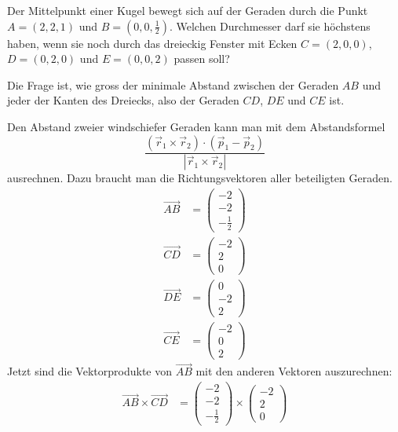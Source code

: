 Der Mittelpunkt einer Kugel bewegt sich auf der Geraden durch
die Punkt $A=(2,2,1)$ und $B=(0,0,\frac12)$. Welchen Durchmesser
darf sie höchstens haben, wenn sie noch durch das dreieckig
Fenster mit Ecken $C=(2,0,0)$, $D=(0,2,0)$ und $E=(0,0,2)$ passen
soll?

\begin{loesung}
Die Frage ist, wie gross der minimale Abstand zwischen
der Geraden $AB$ und jeder der Kanten des Dreiecks, also
der Geraden $CD$, $DE$ und $CE$ ist.

Den Abstand zweier windschiefer Geraden kann man mit dem
Abstandsformel
\[
\frac{(\vec r_1\times \vec r_2)\cdot (\vec p_1-\vec p_2)}{|\vec r_1\times \vec r_2|}
\]
ausrechnen.
Dazu braucht man die Richtungsvektoren aller beteiligten Geraden.
\begin{align*}
\overrightarrow{AB}
&=
\begin{pmatrix} -2\\-2\\-\frac12 \end{pmatrix}
\\
\overrightarrow{CD}
&=
\begin{pmatrix} -2\\2\\0\end{pmatrix}
\\
\overrightarrow{DE}
&=
\begin{pmatrix} 0\\-2\\2\end{pmatrix}
\\
\overrightarrow{CE}
&=
\begin{pmatrix} -2\\0\\2\end{pmatrix}
\end{align*}
Jetzt sind die Vektorprodukte von $\overrightarrow{AB}$ mit den
anderen Vektoren auszurechnen:
\begin{align*}
\overrightarrow{AB}\times\overrightarrow{CD}
&=
\begin{pmatrix} -2\\-2\\-\frac12 \end{pmatrix}
\times
\begin{pmatrix} -2\\2\\0\end{pmatrix}

\end{align*}
\end{loesung}
